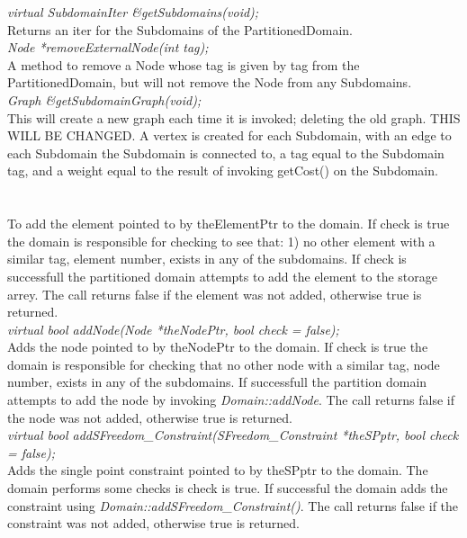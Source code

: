 {\em virtual SubdomainIter \&getSubdomains(void);} \\
Returns an iter for the Subdomains of the PartitionedDomain. \\


{\em Node *removeExternalNode(int tag); } \\
A method to remove a Node whose tag is given by \p tag from the PartitionedDomain, 
but will not remove the Node from any Subdomains. \\

{\em Graph \&getSubdomainGraph(void); } \\
This will create a new graph each time it is invoked; deleting the old graph. THIS WILL
BE CHANGED.  A vertex is created for each Subdomain, with an edge to each Subdomain the 
Subdomain is connected to, a tag equal to the Subdomain tag,  and a weight equal to the 
result of invoking getCost() on the Subdomain. \\

\\
  \\
To add the element pointed to by theElementPtr to the domain. If \p check
is \p true the domain is responsible for checking to see that: 1)
no other element with a similar tag, element number, exists in any of
the subdomains. If check is successfull the partitioned domain
attempts to add the element to the storage arrey. The call returns
\p false if the element was not added, otherwise \p true is 
returned.\\   

{\em virtual bool addNode(Node *theNodePtr, bool check = false);}  \\
Adds the node pointed to by theNodePtr to the domain. If \p check
is \p true the domain is responsible for checking that no other
node with a similar tag, node number, exists in any of the
subdomains. If successfull the partition domain attempts to add the
node by invoking {\em Domain::addNode}. The call returns \p false if
the node was not added, otherwise \p true is returned. \\  


{\em virtual bool addSFreedom\_Constraint(SFreedom\_Constraint *theSPptr, bool
check = false);}  \\
Adds the single point constraint pointed to by theSPptr to the 
domain. The domain performs some checks is \p check is true. If
successful the domain adds the constraint using {\em
Domain::addSFreedom\_Constraint()}. The call returns \p false if
the constraint was not added, otherwise \p true is returned. \\  

